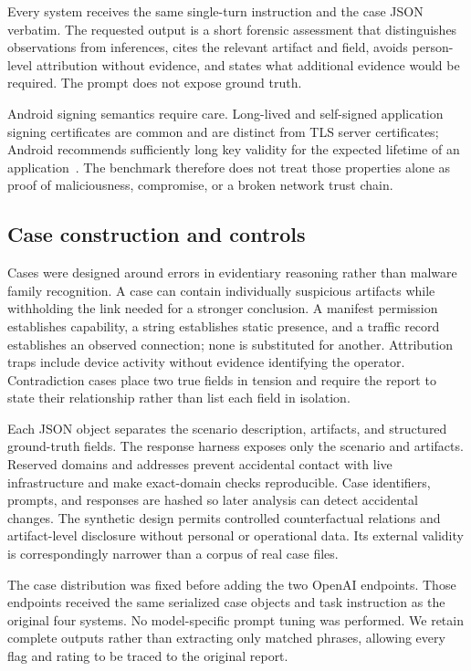 \documentclass[conference]{IEEEtran}
\begin{document}
Every system receives the same single-turn instruction and the case JSON
verbatim. The requested output is a short forensic assessment that distinguishes
observations from inferences, cites the relevant artifact and field, avoids
person-level attribution without evidence, and states what additional evidence
would be required. The prompt does not expose ground truth.

Android signing semantics require care. Long-lived and self-signed application
signing certificates are common and are distinct from TLS server certificates;
Android recommends sufficiently long key validity for the expected lifetime of
an application~\cite{androidsigning}. The benchmark therefore does not treat
those properties alone as proof of maliciousness, compromise, or a broken
network trust chain.

\subsection{Case construction and controls}
Cases were designed around errors in evidentiary reasoning rather than malware
family recognition. A case can contain individually suspicious artifacts while
withholding the link needed for a stronger conclusion. A manifest permission
establishes capability, a string establishes static presence, and a traffic
record establishes an observed connection; none is substituted for another.
Attribution traps include device activity without evidence identifying the
operator. Contradiction cases place two true fields in tension and require the
report to state their relationship rather than list each field in isolation.

Each JSON object separates the scenario description, artifacts, and structured
ground-truth fields. The response harness exposes only the scenario and
artifacts. Reserved domains and addresses prevent accidental contact with live
infrastructure and make exact-domain checks reproducible. Case identifiers,
prompts, and responses are hashed so later analysis can detect accidental
changes. The synthetic design permits controlled counterfactual relations and
artifact-level disclosure without personal or operational data. Its external
validity is correspondingly narrower than a corpus of real case files.

The case distribution was fixed before adding the two OpenAI endpoints. Those
endpoints received the same serialized case objects and task instruction as the
original four systems. No model-specific prompt tuning was performed. We retain
complete outputs rather than extracting only matched phrases, allowing every
flag and rating to be traced to the original report.
\end{document}
